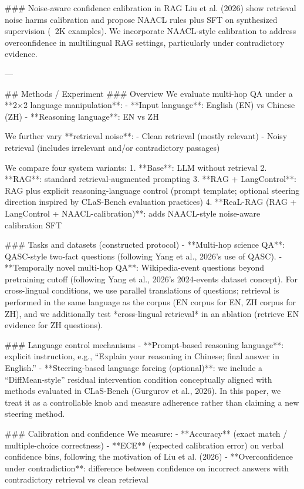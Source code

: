### Noise-aware confidence calibration in RAG
Liu et al. (2026) show retrieval noise harms calibration and propose NAACL rules plus SFT on synthesized supervision (~2K examples). We incorporate NAACL-style calibration to address overconfidence in multilingual RAG settings, particularly under contradictory evidence.

---

## Methods / Experiment
### Overview
We evaluate multi-hop QA under a **2×2 language manipulation**:
- **Input language**: English (EN) vs Chinese (ZH)
- **Reasoning language**: EN vs ZH

We further vary **retrieval noise**:
- Clean retrieval (mostly relevant)
- Noisy retrieval (includes irrelevant and/or contradictory passages)

We compare four system variants:
1. **Base**: LLM without retrieval
2. **RAG**: standard retrieval-augmented prompting
3. **RAG + LangControl**: RAG plus explicit reasoning-language control (prompt template; optional steering direction inspired by CLaS-Bench evaluation practices)
4. **ReaL-RAG (RAG + LangControl + NAACL-calibration)**: adds NAACL-style noise-aware calibration SFT

### Tasks and datasets (constructed protocol)
- **Multi-hop science QA**: QASC-style two-fact questions (following Yang et al., 2026’s use of QASC).
- **Temporally novel multi-hop QA**: Wikipedia-event questions beyond pretraining cutoff (following Yang et al., 2026’s 2024-events dataset concept).  
For cross-lingual conditions, we use parallel translations of questions; retrieval is performed in the same language as the corpus (EN corpus for EN, ZH corpus for ZH), and we additionally test *cross-lingual retrieval* in an ablation (retrieve EN evidence for ZH questions).

### Language control mechanisms
- **Prompt-based reasoning language**: explicit instruction, e.g., “Explain your reasoning in Chinese; final answer in English.”
- **Steering-based language forcing (optional)**: we include a “DiffMean-style” residual intervention condition conceptually aligned with methods evaluated in CLaS-Bench (Gurgurov et al., 2026). In this paper, we treat it as a controllable knob and measure adherence rather than claiming a new steering method.

### Calibration and confidence
We measure:
- **Accuracy** (exact match / multiple-choice correctness)
- **ECE** (expected calibration error) on verbal confidence bins, following the motivation of Liu et al. (2026)
- **Overconfidence under contradiction**: difference between confidence on incorrect answers with contradictory retrieval vs clean retrieval

